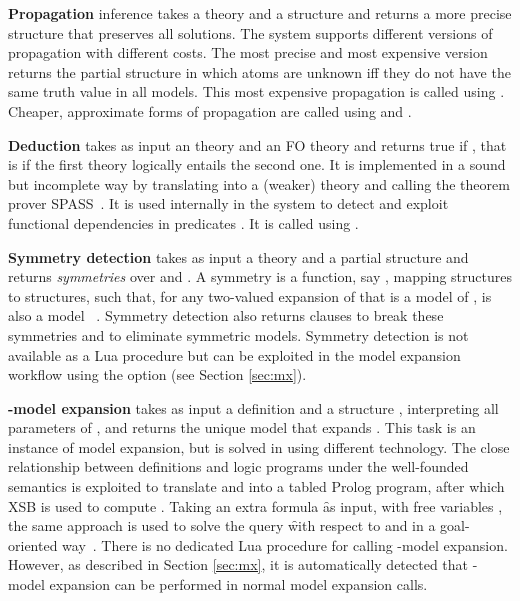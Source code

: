 \textbf{Propagation} inference takes a theory and a structure and
returns a more precise structure that preserves all solutions. The
system supports different versions of propagation with different
costs. The most precise and most expensive version returns the partial
structure in which atoms are unknown iff they do not have the same
truth value in all models. This most expensive propagation is called using . 
Cheaper, approximate forms of propagation are called using  and .

\textbf{Deduction} takes as input an \foidaggpft theory \theory and an
FO theory  and returns true if , that is if the first theory logically entails the
second one. It is implemented in a sound but incomplete way by
translating \theory into a (weaker) \FO theory and calling the theorem
prover SPASS~\cite{cade/WeidenbachDFKSW09}. It is used internally in
the \idp system to detect and exploit functional dependencies in
predicates \cite{iclp/DeCatB13}. It is called using .

\textbf{Symmetry detection} takes as input a theory \theory and a
partial structure \I and returns \emph{symmetries} over \theory and
\I. A symmetry is a function, say , mapping structures to
structures, such that, for any two-valued expansion  of \I that is
a model of \theory,  is also a model
~\cite{ictai/DevriendtBMDD12}. Symmetry detection also returns clauses
to break these symmetries and to eliminate symmetric models. 
Symmetry detection is not available as a Lua procedure but can be exploited in the model expansion workflow using the option  (see Section \ref{sec:mx}).

\textbf{\D-model expansion} takes as input a definition \D and a
structure , interpreting all parameters of \D, and returns
the unique model \I that expands . This task is an instance
of model expansion, but is solved in \idp using different
technology. The close relationship between definitions and logic
programs under the well-founded semantics is exploited to translate \D
and  into a tabled Prolog program, after which XSB is used to
compute \I.  Taking an extra formula \f as input, with free variables
\xxx, the same approach is used to solve the query \f with respect to
\D and  in a goal-oriented way~\cite{tplp/Jansen13}. There is no dedicated Lua procedure for calling -model expansion. However, as described in Section \ref{sec:mx}, it is automatically detected that -model expansion can be performed in normal model expansion calls. 

